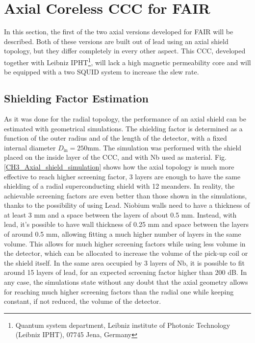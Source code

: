 \documentclass[12pt,a4paper]{report}
\begin{document}
       \section{Axial Coreless CCC for FAIR}
       
       In this section, the first of the two axial versions developed for FAIR will be described. Both of these versions are built out of lead using an axial shield topology, but they differ completely in every other aspect. This CCC, developed together with Leibniz IPHT\footnote{Quantum system department, Leibniz institute of Photonic Technology (Leibniz IPHT), 07745 Jena, Germany}, will lack a high magnetic permeability core and will be equipped with a two SQUID system to increase the slew rate.
       
       \subsection{Shielding Factor Estimation}
       
       As it was done for the radial topology, the performance of an axial shield can be estimated with geometrical simulations. The shielding factor is determined as a function of the outer radius and of the length of the detector, with a fixed internal diameter \(D_{\text{in}} = 250 \text{mm}\). The simulation was performed with the shield placed on the inside layer of the CCC, and with Nb used as material. Fig.\ref{CH3_Axial_shield_simulation} shows how the axial topology is much more effective to reach higher screening factor, 3 layers are enough to have the same shielding of a radial superconducting shield with 12 meanders. In reality, the achievable screening factors are even better than those shown in the simulations, thanks to the possibility of using Lead. Niobium walls need to have a thickness of at least 3 mm and a space between the layers of about 0.5 mm. Instead, with lead, it's possible to have wall thickness of 0.25 mm and space between the layers of around 0.5 mm, allowing fitting a much higher number of layers in the same volume. This allows for much higher screening factors while using less volume in the detector, which can be allocated to increase the volume of the pick-up coil or the shield itself. In the same area occupied by 3 layers of Nb, it is possible to fit around 15 layers of lead, for an expected screening factor higher than 200 dB. In any case, the simulations state without any doubt that the axial geometry allows for reaching much higher screening factors than the radial one while keeping constant, if not reduced, the volume of the detector.
       
\end{document}
